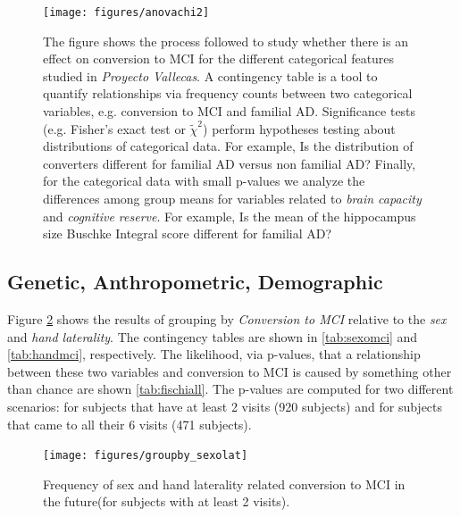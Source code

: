 \documentclass[11pt]{article}
\theoremstyle{definition}
\theoremstyle{remark}
\begin{document}
\begin{figure}[H]
        \centering
        \texttt{[image: figures/anovachi2]}
        \caption{The figure shows the process followed to study whether there is an effect on conversion to MCI for the different categorical features studied in \emph{Proyecto Vallecas}. A contingency table is a tool to quantify relationships via frequency counts between two categorical variables, e.g. conversion to MCI and familial AD. Significance tests (e.g. Fisher's exact test \cite{fisher1937design}or $\tilde{\chi}^2$) perform hypotheses testing about distributions of categorical data. For example, Is the distribution of converters different for familial AD versus non familial AD? Finally, for the categorical data with small p-values we analyze the differences among group means for variables related to \emph{brain capacity} and \emph{cognitive reserve}. For example, Is the mean of the hippocampus size Buschke Integral score different for familial AD?
        } 
        \label{fig:anovachi}
\end{figure}


\subsection{Genetic, Anthropometric, Demographic}


Figure \ref{fig:groupby_sexolat} shows the results of grouping by \emph{Conversion to MCI} relative to the \emph{sex} and \emph{hand laterality}. The contingency tables are shown in \ref{tab:sexomci} and \ref{tab:handmci}, respectively.
The likelihood, via p-values, that a relationship between these two variables and conversion to MCI is caused by something other than chance are shown \ref{tab:fischiall}. The p-values are computed for two different scenarios: for subjects that have at least 2 visits (920 subjects) and for subjects that came to all their 6 visits (471 subjects).

\begin{figure}[H]
        \centering
        \texttt{[image: figures/groupby\_sexolat]}
        \caption{Frequency of sex and hand laterality related conversion to MCI in the future(for subjects with at least 2 visits).} 
        \label{fig:groupby_sexolat}
\end{figure}
\end{document}
